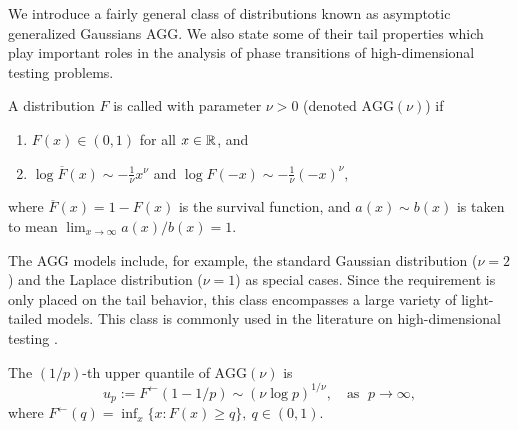 
We introduce a fairly general class of distributions known as asymptotic generalized Gaussians \ac{AGG}. 
We also state some of their tail properties which play important roles in the analysis of phase transitions of high-dimensional testing problems.

\begin{definition} \label{def:AGG}
A distribution $F$ is called  
with parameter $\nu>0$ (denoted $\text{AGG}(\nu)$) if
\begin{enumerate}
    \item $F(x)\in(0,1)$ for all $x\in\mathbb R$, and \smallskip
    \item $\log{\overline{F}(x)} \sim -\frac{1}{\nu}x^\nu$ and $\log{F(-x)} \sim -\frac{1}{\nu}(-x)^\nu,$ \label{eq:AGG}
\end{enumerate}
where $\overline{F}(x) = 1 - F(x)$ is the survival function, and $a(x)\sim b(x)$ is taken to mean $\lim_{x\to\infty} a(x)/b(x) = 1$.
\end{definition}

The AGG models include, for example, the standard Gaussian distribution ($\nu = 2$) and the Laplace distribution ($\nu = 1$) as special cases. 
Since the requirement is only placed on the tail behavior, this class encompasses a large variety of light-tailed models. 
This class is commonly used in the literature on high-dimensional testing
 \citep{cai2007estimation, arias2017distribution}.



\begin{proposition} \label{prop:quantile}
The $(1/p)$-th upper quantile of $\text{AGG}(\nu)$ is
\begin{equation} \label{eq:AGG-quantiles}
    u_{p} := F^\leftarrow(1-1/p) \sim \left(\nu\log{p}\right)^{1/\nu},\quad \text{as }\;p\to\infty,
\end{equation}
where $F^\leftarrow(q) = \inf_x\{x:F(x)\ge q\},\ q\in (0,1)$.
\end{proposition}


